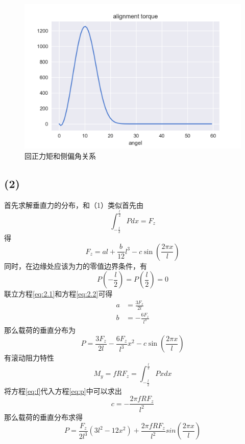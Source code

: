 \documentclass[paper=a4, fontsize=11pt]{scrartcl} %
\numberwithin{equation}{section} %
\numberwithin{figure}{section} %
\numberwithin{table}{section} %
\begin{document}
\begin{figure}[ht]
\centering
\includegraphics[width=\textwidth]{1-2.png}
\caption{回正力矩和侧偏角关系}
\label{fig:1-2}
\end{figure}
\subsection{(2)}
首先求解垂直力的分布，和（1）类似首先由
\begin{equation}
\int_{-\frac{l}{2}}^{\frac{l}{2}} P dx = F_z
\end{equation}
得
\begin{equation}
\label{eq:2.1}
F_z = al + \frac{b}
{12}l^3 - c \sin(\frac{2\pi x}{l})
\end{equation}
同时，在边缘处应该为力的零值边界条件，有
\begin{equation}
\label{eq:2.2}
P(-\frac{l}{2}) = 
P(\frac{l}{2})  = 0
\end{equation}
联立方程\ref{eq:2.1}和方程\ref{eq:2.2}可得
\begin{align*}
a & = \frac{3F_z}{2l}\\
b & = -\frac{6F_z}{l^3}
\end{align*}
那么载荷的垂直分布为
\begin{equation*}
\label{eq:p}
P = \frac{3F_z}{2l} -\frac{6F_z}{l^3}x^2- c \sin(\frac{2\pi x}{l})
\end{equation*}
有滚动阻力特性
\begin{equation}
\label{eq:f}
M_y = fRF_z = \int_{-\frac{l}{2}}^{\frac{l}{2}} Px dx
\end{equation}
将方程\ref{eq:f}代入方程\ref{eq:p}中可以求出
\begin{equation}
c = -\frac{2\pi fRF_z}{l^2}
\end{equation}
那么载荷的垂直分布求得
\begin{equation}
P = \frac{F_z}{2l^3}(3l^2 - 12x^2) + \frac{2\pi fRF_z}{l^2}sin(\frac{2\pi x}{l})
\end{equation}
\end{document}
